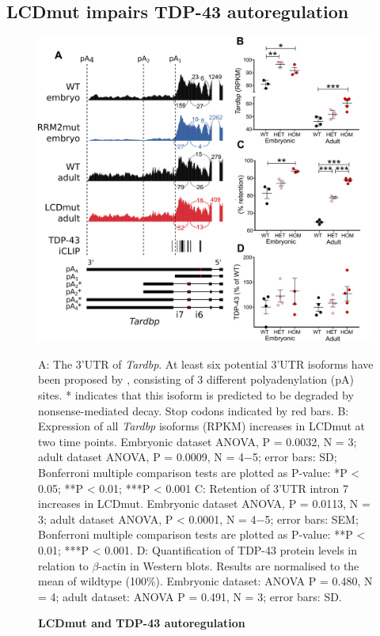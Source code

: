 \subsection{LCDmut impairs TDP-43 autoregulation}

\begin{figure}[h!]
	\centering
	\includegraphics[width=\textwidth]{Figures/05_tdp_mice/autoregulation.png}
	\caption{\textbf{LCDmut and TDP-43 autoregulation}}
	A: The 3'UTR of \textit{Tardbp}. At least six potential 3'UTR isoforms have been proposed by \citep{Koyama2016}, consisting of 3 different polyadenylation (pA) sites. * indicates that this isoform is predicted to be degraded by nonsense-mediated decay. Stop codons indicated by red bars. 
	B: Expression of all \textit{Tardbp} isoforms (RPKM) increases in LCDmut at two time points.  Embryonic dataset ANOVA, P = 0.0032, N = 3; adult dataset ANOVA, P = 0.0009, N = 4$-$5; error bars: SD; Bonferroni multiple comparison tests are plotted as P-value: *P < 0.05; **P < 0.01; ***P < 0.001
	C: Retention of 3'UTR intron 7 increases in LCDmut. Embryonic dataset ANOVA, P = 0.0113, N = 3; adult dataset ANOVA, P < 0.0001, N = 4$-$5; error bars: SEM; Bonferroni multiple comparison tests are plotted as P-value: **P < 0.01; ***P < 0.001.
	D: Quantification of TDP-43 protein levels in relation to $\beta$-actin in Western blots. Results are normalised to the mean of wildtype (100\%). Embryonic dataset: ANOVA P = 0.480, N = 4; adult dataset: ANOVA P = 0.491, N = 3; error bars: SD.
	\label{fig:autoregulation}
\end{figure}

